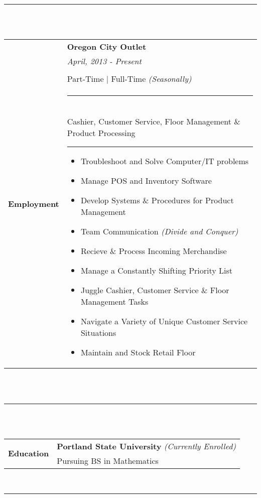 \documentclass[12pt]{article}
\begin{document}
\\\\\rule{5.5in}{1pt}\\\\
\normalsize
\begin{tabular}{r|l}
\multirow{5}{*}{\textbf{Employment}} &\hspace{3cm}\textbf{Oregon City Outlet}\\
& \footnotesize\hspace{0.7em}\hspace{3cm} \textit{April, 2013 - Present}\small\\\\
& \hspace{2cm}Part-Time  \hspace{0.5em}|\hspace{0.5em} Full-Time \footnotesize\textit{(Seasonally)}\\
& \parbox{\textwidth}{\footnotesize
	\rule{4.2in}{.6pt}\\
	Cashier, Customer Service, Floor Management \& Product Processing\\
	\hspace*{2em} \rule[0.5em]{3.5in}{0.1pt}
	\begin{itemize}[noitemsep, topsep=0em] \footnotesize
	\item Troubleshoot and Solve Computer/IT problems
	\item Manage POS and Inventory Software
	\item Develop Systems \& Procedures for Product Management
	\item Team Communication \textit{(Divide and Conquer)}
	\item Recieve \& Process Incoming Merchandise
	\item Manage a Constantly Shifting Priority List
	\item Juggle Cashier, Customer Service \& Floor Management Tasks
	\item Navigate a Variety of Unique Customer Service Situations
	\item Maintain and Stock Retail Floor
	\end{itemize}
	}
\end{tabular} \normalsize
\\\\\rule{5.5in}{1pt}\\\\
\begin{tabular}{r|l}
\multirow{2}{*}{\textbf{Education}} & \textbf{Portland State University} \footnotesize\textit{(Currently Enrolled)}\\
& \footnotesize Pursuing BS in Mathematics\\
\end{tabular}
\\\rule[-1.05em]{5.5in}{1pt}
\end{document}
